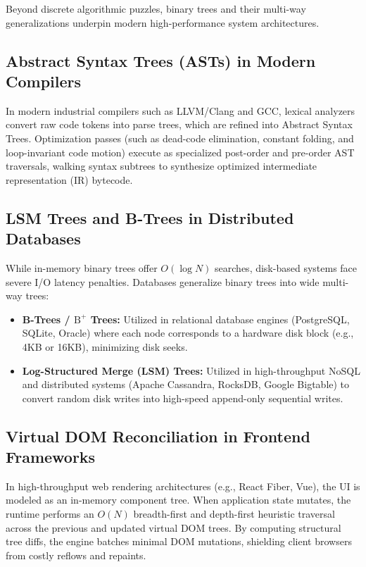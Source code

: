 \documentclass[10pt,journal,compsoc,onecolumn]{IEEEtran}
\begin{document}
Beyond discrete algorithmic puzzles, binary trees and their multi-way generalizations underpin modern high-performance system architectures.

\subsection{Abstract Syntax Trees (ASTs) in Modern Compilers}
In modern industrial compilers such as LLVM/Clang and GCC, lexical analyzers convert raw code tokens into parse trees, which are refined into Abstract Syntax Trees. Optimization passes (such as dead-code elimination, constant folding, and loop-invariant code motion) execute as specialized post-order and pre-order AST traversals, walking syntax subtrees to synthesize optimized intermediate representation (IR) bytecode.

\subsection{LSM Trees and B-Trees in Distributed Databases}
While in-memory binary trees offer $O(\log N)$ searches, disk-based systems face severe I/O latency penalties. Databases generalize binary trees into wide multi-way trees:
\begin{itemize}
    \item \textbf{B-Trees / $\text{B}^+$ Trees:} Utilized in relational database engines (PostgreSQL, SQLite, Oracle) where each node corresponds to a hardware disk block (e.g., 4KB or 16KB), minimizing disk seeks.
    \item \textbf{Log-Structured Merge (LSM) Trees:} Utilized in high-throughput NoSQL and distributed systems (Apache Cassandra, RocksDB, Google Bigtable) to convert random disk writes into high-speed append-only sequential writes.
\end{itemize}

\subsection{Virtual DOM Reconciliation in Frontend Frameworks}
In high-throughput web rendering architectures (e.g., React Fiber, Vue), the UI is modeled as an in-memory component tree. When application state mutates, the runtime performs an $O(N)$ breadth-first and depth-first heuristic traversal across the previous and updated virtual DOM trees. By computing structural tree diffs, the engine batches minimal DOM mutations, shielding client browsers from costly reflows and repaints.
\end{document}
